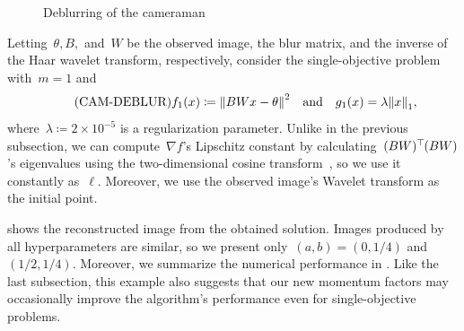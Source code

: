 \documentclass[../main]{subfiles}
\begin{document}
\begin{figure}[htpb]
\begin{minipage}[b]{.45\hsize}
    \end{minipage}
    \caption{Deblurring of the cameraman}
\end{figure}

Letting~$\theta, B,$ and~$W$ be the observed image, the blur matrix, and the inverse of the Haar wavelet transform, respectively, consider the single-objective problem~ with~$m = 1$ and
\begin{equation} \label{eq:cam_deblur} \tag{CAM-DEBLUR}
    f_1(x) \coloneqq \norm*{BWx - \theta}^2 \eqand g_1(x)=\lambda \norm*{x}_1
,\end{equation} 
where~$\lambda \coloneqq 2 \times 10^{-5}$ is a regularization parameter.
Unlike in the previous subsection, we can compute~$\nabla f$'s Lipschitz constant by calculating~$(BW)^\top\hspace{-1pt}(BW)$'s eigenvalues using the two-dimensional cosine transform~\cite{Hansen2006}, so we use it constantly as~$\ell$.
Moreover, we use the observed image's Wavelet transform as the initial point.

 shows the reconstructed image from the obtained solution.
Images produced by all hyperparameters are similar, so we present only~$(a, b) = (0, 1 / 4)$ and~$(1 / 2, 1 / 4)$.
Moreover, we summarize the numerical performance in .
Like the last subsection, this example also suggests that our new momentum factors may occasionally improve the algorithm's performance even for single-objective problems.
\end{document}
